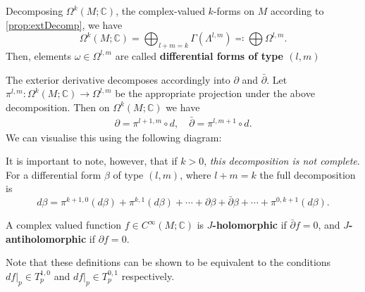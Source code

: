 \documentclass[11pt, final]{article}
\begin{document}
\begin{definition}
	Decomposing $\Omega^k(M;\mathbb{C})$, the complex-valued $k$-forms on $M$ according to \autoref{prop:extDecomp}, we have
		\begin{equation}
			\Omega^k(M;\mathbb{C}) = \bigoplus_{l+m=k} \Gamma\left(\Lambda^{l,m}\right) \eqqcolon \bigoplus \Omega^{l,m}.
		\end{equation}
	Then, elements $\omega \in \Omega^{l,m}$ are called \textbf{differential forms of type $(l,m)$}
\end{definition}
\begin{remark}
	The exterior derivative decomposes accordingly into $\partial$ and $\bar{\partial}$. Let $\pi^{l,m}: \Omega^k(M; \mathbb{C}) \to \Omega^{l,m}$ be the appropriate projection under the above decomposition. Then on $\Omega^k(M;\mathbb{C})$ we have
		\begin{align}
			\partial = \pi^{l+1, m} \circ d, \quad \bar{\partial} = \pi^{l, m+1} \circ d.
		\end{align}
	We can visualise this using the following diagram:
		\begin{center}
			
		\end{center}
	It is important to note, however, that if $k>0$, \textit{this decomposition is not complete}. For a differential form $\beta$ of type $(l,m)$, where $l+m=k$ the full decomposition is
		\begin{equation}
			d\beta = \pi^{k+1,0}(d\beta) + \pi^{k,1}(d\beta) + \cdots + \partial \beta + \bar{\partial} \beta + \cdots + \pi^{0,k+1}(d\beta).
		\end{equation}
\end{remark}

\begin{definition}[$J$-Holomorphic]
	A complex valued function $f \in C^\infty(M;\mathbb{C})$ is $J$\textbf{-holomorphic} if $\bar{\partial}f = 0$, and $J$\textbf{-antiholomorphic} if $\partial f =0$.
\end{definition}
\begin{remark}
	Note that these definitions can be shown to be equivalent to the conditions $df|_p \in T_p^{1,0}$ and $df|_p \in T_p^{0,1}$ respectively.
\end{remark}
\end{document}
